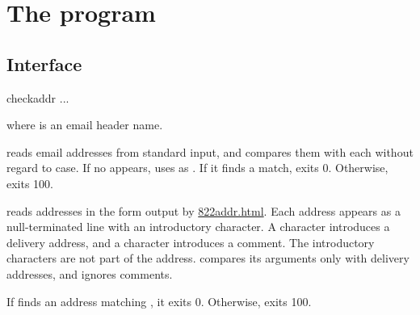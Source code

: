 
\chapter{The  program}

\section{Interface}
\begin{code}
  checkaddr  ...
\end{code}
where  is an email header name.

 reads email addresses from standard input,
and compares them with each  without regard to case.
If no  appears,  uses
 as .
If it finds a match,  exits 0.  Otherwise,
 exits 100.

 reads addresses in the form output by 
\href{\cmd{822addr}}{822addr.html}.  Each address appears
as a null-terminated line with an introductory character.
A \cmd{+} character introduces a
delivery address, and a \cmd{(} character introduces a comment.
The introductory characters are not part of the address.
 compares its arguments only with delivery
addresses, and ignores comments.

If  finds an address matching , it exits 0.
Otherwise,  exits 100.


